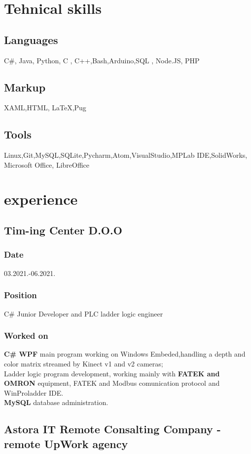 \documentclass[10pt]{article}
\begin{document}
\section{Tehnical skills}
\subsection{Languages}
C\#, Java, Python, C , C++,Bash,Arduino,SQL , Node.JS, PHP
\subsection{Markup}
XAML,HTML, \LaTeX,Pug
\subsection{Tools}
Linux,Git,MySQL,SQLite,Pycharm,Atom,VisualStudio,MPLab IDE,SolidWorks, Microsoft Office, LibreOffice

\section{experience}
\subsection{\large{Tim-ing Center D.O.O}}
\subsubsection{Date}
03.2021.-06.2021.
\subsubsection{Position}
C\# Junior Developer and PLC ladder logic engineer
\subsubsection{Worked on}
\textbf{C\# WPF} main program working on Windows Embeded,handling a depth and color matrix streamed by Kinect v1 and v2 cameras;\\
Ladder logic program development, working mainly with \textbf{FATEK and OMRON} equipment, FATEK and Modbus comunication protocol and WinProladder IDE.\\
\textbf{MySQL} database administration.\\

\subsection{\large{Astora IT Remote Consalting Company - remote UpWork agency}}
\end{document}
